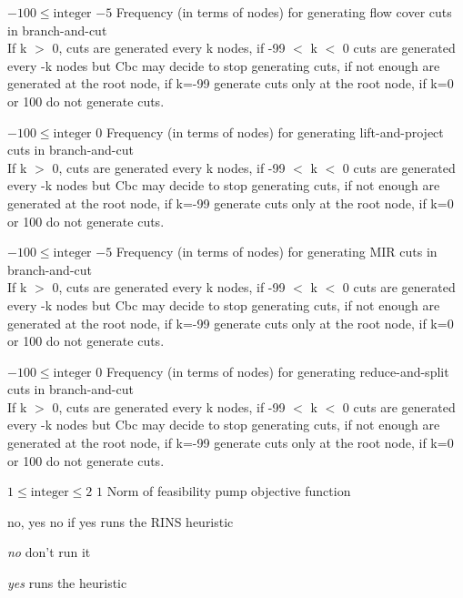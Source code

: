 %
{$-100\leq\textrm{integer}$}%
{$-5$}%
{Frequency (in terms of nodes) for generating flow cover cuts in branch-and-cut\\
If k $>$ 0, cuts are generated every k nodes, if -99 $<$ k $<$ 0 cuts are generated every -k nodes but Cbc may decide to stop generating cuts, if not enough are generated at the root node, if k=-99 generate cuts only at the root node, if k=0 or 100 do not generate cuts.}%
{}

%
{$-100\leq\textrm{integer}$}%
{$0$}%
{Frequency (in terms of nodes) for generating lift-and-project cuts in branch-and-cut\\
If k $>$ 0, cuts are generated every k nodes, if -99 $<$ k $<$ 0 cuts are generated every -k nodes but Cbc may decide to stop generating cuts, if not enough are generated at the root node, if k=-99 generate cuts only at the root node, if k=0 or 100 do not generate cuts.}%
{}

%
{$-100\leq\textrm{integer}$}%
{$-5$}%
{Frequency (in terms of nodes) for generating MIR cuts in branch-and-cut\\
If k $>$ 0, cuts are generated every k nodes, if -99 $<$ k $<$ 0 cuts are generated every -k nodes but Cbc may decide to stop generating cuts, if not enough are generated at the root node, if k=-99 generate cuts only at the root node, if k=0 or 100 do not generate cuts.}%
{}

%
{$-100\leq\textrm{integer}$}%
{$0$}%
{Frequency (in terms of nodes) for generating reduce-and-split cuts in branch-and-cut\\
If k $>$ 0, cuts are generated every k nodes, if -99 $<$ k $<$ 0 cuts are generated every -k nodes but Cbc may decide to stop generating cuts, if not enough are generated at the root node, if k=-99 generate cuts only at the root node, if k=0 or 100 do not generate cuts.}%
{}

%
{$1\leq\textrm{integer}\leq2$}%
{$1$}%
{Norm of feasibility pump objective function}%
{}

%
{no, yes}%
{no}%
{if yes runs the RINS heuristic}%
{\begin{list}{}{
\setlength{\parsep}{0em}
\setlength{\leftmargin}{3ex}
\setlength{\labelwidth}{1ex}
\setlength{\itemindent}{0ex}
\setlength{\topsep}{0pt}}
\item[\textit{no}] don't run it
\item[\textit{yes}] runs the heuristic
\end{list}
}

